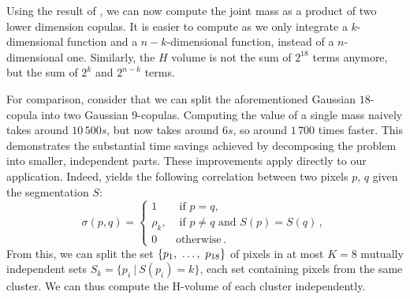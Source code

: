 Using the result of , we can now compute the joint mass as a product of two lower dimension copulas. It is easier to compute as we only integrate a $k$-dimensional function and a $n-k$-dimensional function, instead of a $n$-dimensional one. Similarly, the $H$ volume is not the sum of $2^{18}$ terms anymore, but the sum of $2^{k}$ and $2^{n-k}$ terms.

For comparison, consider that we can split the aforementioned Gaussian $18$-copula into two Gaussian $9$-copulas. Computing the value of a single mass naively takes around $10\,500s$, but now takes around $6s$, so around $1\,700$ times faster. This demonstrates the substantial time savings achieved by decomposing the problem into smaller, independent parts. These improvements apply directly to our application. Indeed,  yields the following correlation between two pixels $p$, $q$ given the segmentation $S$:
\begin{equation*}
    \sigma(p, q) =
    \begin{cases}
        1 &\text{ if }p=q,\\
        \rho_k, &\text{ if } p\ne q\text{ and }S(p)=S(q)\,, \\
        0 & \text{otherwise}\,.
    \end{cases}
\end{equation*}
From this, we can split the set $\{p_1 , ~\ldots, ~ p_{18}\}$ of pixels in at most $K=8$ mutually independent sets $S_k = \{p_i~|~S(p_i)=k\}$, each set containing pixels from the same cluster. We can thus compute the H-volume of each cluster independently.


